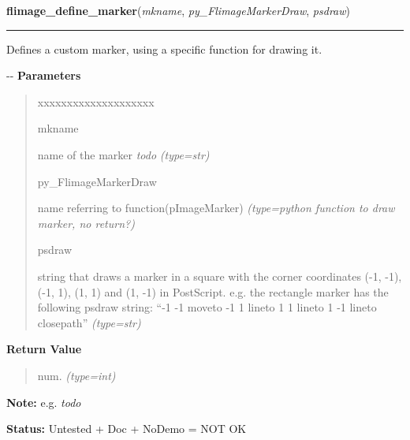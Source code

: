 \hspace{.8\funcindent}\begin{boxedminipage}{\funcwidth}

    \raggedright \textbf{flimage\_define\_marker}(\textit{mkname}, \textit{py\_FlimageMarkerDraw}, \textit{psdraw})

    \vspace{-1.5ex}

    \rule{\textwidth}{0.5\fboxrule}
\setlength{\parskip}{2ex}

Defines a custom marker, using a specific function for drawing it.

-{}-
\setlength{\parskip}{1ex}
      \textbf{Parameters}
      \vspace{-1ex}

      \begin{quote}
        \begin{Ventry}{xxxxxxxxxxxxxxxxxxxx}

          \item[mkname]


name of the marker \emph{todo}
            {\it (type=str)}

          \item[py\_FlimageMarkerDraw]


name referring to function(pImageMarker)
            {\it (type=python function to draw marker, no return?)}

          \item[psdraw]


string that draws a marker in a square with the corner coordinates
(-1, -1), (-1, 1), (1, 1) and (1, -1) in PostScript. e.g. the rectangle
marker has the following psdraw string: ``-1 -1 moveto -1  1 lineto
1  1 lineto  1 -1 lineto  closepath''
            {\it (type=str)}

        \end{Ventry}

      \end{quote}

      \textbf{Return Value}
    \vspace{-1ex}

      \begin{quote}

num.
      {\it (type=int)}

      \end{quote}

\textbf{Note:} 
e.g. \emph{todo}


\textbf{Status:} 
Untested + Doc + NoDemo = NOT OK


    \end{boxedminipage}

